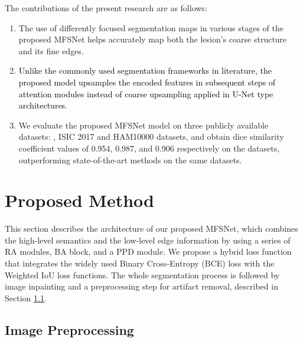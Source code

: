 \documentclass[review]{elsarticle}
\begin{document}
The contributions of the present research are as follows:
\begin{enumerate}
    \item The use of differently focused segmentation maps in various stages of the proposed MFSNet helps accurately map both the lesion's coarse structure and its fine edges.
    \item \textcolor{black}{Unlike the commonly used segmentation frameworks in literature, the proposed model upsamples the encoded features in subsequent steps of attention modules instead of coarse upsampling applied in U-Net type architectures.}
    \item We evaluate the proposed MFSNet model on three publicly available datasets: , ISIC 2017 and HAM10000 datasets, and obtain dice similarity coefficient values of 0.954, 0.987, and 0.906 respectively on the datasets, outperforming state-of-the-art methods on the same datasets.
\end{enumerate}











\section{Proposed Method}\label{method}
This section describes the architecture of our proposed MFSNet, which combines the high-level semantics and the low-level edge information by using a series of RA modules, BA block, and a PPD module. We propose a hybrid loss function that integrates the widely used Binary Cross-Entropy (BCE) loss with the Weighted IoU loss functions. The whole segmentation process is followed by image inpainting and a preprocessing step for artifact removal, described in Section \ref{preprocess}.

\subsection{Image Preprocessing}\label{preprocess}
\end{document}
